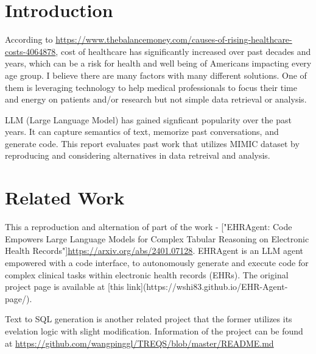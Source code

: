 \documentclass[acmsmall]{acmart}
\begin{document}
\maketitle

\section{Introduction}
According to \url{https://www.thebalancemoney.com/causes-of-rising-healthcare-costs-4064878}, 
cost of healthcare has significantly increased over past decades and years, which can be a 
risk for health and well being of Americans impacting every age group. I believe there 
are many factors with many different solutions. One of them is leveraging technology 
to help medical professionals to focus their time and energy on patients and/or research 
but not simple data retrieval or analysis.

LLM (Large Language Model) has gained signficant popularity over the past years. It can 
capture semantics of text, memorize past conversations, and generate code. This report 
evaluates past work that utilizes MIMIC\cite{PhysioBank_PhysioToolkit_PhysioNet}\cite{physioNet}\cite{Johnson2016}
dataset by reproducing and considering alternatives in data retreival and analysis.

\section{Related Work}
This a reproduction and alternation of part of the work - ["EHRAgent: Code Empowers Large Language Models 
for Complex Tabular Reasoning on Electronic Health Records"]\url{https://arxiv.org/abs/2401.07128}. 
EHRAgent is an LLM agent empowered with a code interface, to autonomously generate and 
execute code for complex clinical tasks within electronic health records (EHRs). 
The original project page is available at [this link](https://wshi83.github.io/EHR-Agent-page/). \cite{shi2024ehragent}

Text to SQL generation is another related project that the former utilizes its evelation logic 
with slight modification. Information of the project can be found at
\url{https://github.com/wangpinggl/TREQS/blob/master/README.md} \cite{wang2020text}
\end{document}
